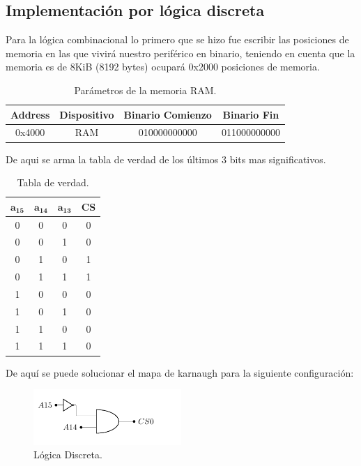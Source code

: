 \subsection{Implementación por lógica discreta}
Para la lógica combinacional lo primero que se hizo fue escribir las posiciones de memoria en las que vivirá nuestro periférico en binario, teniendo en cuenta que la memoria es de 8KiB (8192 bytes) ocupará 0x2000 posiciones de memoria.
\begin{table}[H]
\centering
\begin{tabular}{cccc}
\hline
\textbf{Address} & \textbf{Dispositivo} & \textbf{Binario Comienzo} & \textbf{Binario Fin} \\ \hline
0x4000 & RAM & 010000000000 & 011000000000 \\ \hline
\end{tabular}
\caption{Parámetros de la memoria RAM.}
\end{table}
De aqui se arma la tabla de verdad de los últimos 3 bits mas significativos.
\begin{table}[H]
\centering
\begin{tabular}{cccc}
\hline
$\mathbf{a_{15}}$ & $\mathbf{a_{14}}$ & $\mathbf{a_{13}}$ & \textbf{CS} \\ \hline
0 & 0 & 0 & 0 \\
0 & 0 & 1 & 0 \\
0 & 1 & 0 & 1 \\
0 & 1 & 1 & 1 \\
1 & 0 & 0 & 0 \\
1 & 0 & 1 & 0 \\
1 & 1 & 0 & 0 \\
1 & 1 & 1 & 0	\\ \hline
\end{tabular}
\caption{Tabla de verdad.}
\label{tab:truetab}

\end{table}
De aquí se puede solucionar el mapa de karnaugh para la siguiente configuración:
\begin{figure}[H]
  \centering
  \includegraphics[width=0.5\textwidth,page = 1]{ImagenesEjercicio1/Circuits.pdf}
  \caption{Lógica Discreta.}
  \label{fig:circLog}
\end{figure}
